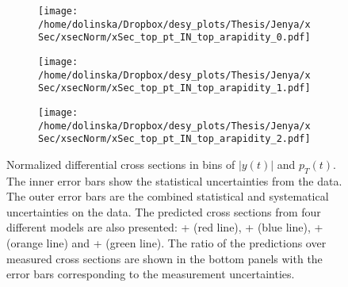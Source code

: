 \begin{figure}[H]
\centering
\begin{subfigure}
  \centering
  \texttt{[image: /home/dolinska/Dropbox/desy\_plots/Thesis/Jenya/xSec/xsecNorm/xSec\_top\_pt\_IN\_top\_arapidity\_0.pdf]}
\end{subfigure}
\begin{subfigure}
  \centering
  \texttt{[image: /home/dolinska/Dropbox/desy\_plots/Thesis/Jenya/xSec/xsecNorm/xSec\_top\_pt\_IN\_top\_arapidity\_1.pdf]}
\end{subfigure}
\begin{subfigure}
  \centering
  \texttt{[image: /home/dolinska/Dropbox/desy\_plots/Thesis/Jenya/xSec/xsecNorm/xSec\_top\_pt\_IN\_top\_arapidity\_2.pdf]}
\end{subfigure}
\caption{Normalized differential cross sections in bins of $|y(t)|$ and $p_{T}(t)$. The inner error bars show the statistical uncertainties from the data.
         The outer error bars are the combined statistical and systematical uncertainties on the data. The predicted cross sections from four different 
         models are also presented: \MG + \PYTHIA (red line), \Powheg + \PYTHIA (blue line), \Powheg + \HERWIG (orange line) and \MCNLO + \HERWIG (green 
         line). The ratio of the predictions over measured cross sections are shown in the bottom panels with the error bars corresponding to the measurement
         uncertainties.}
\label{fig:XS_2D_y_pt}
\end{figure}
